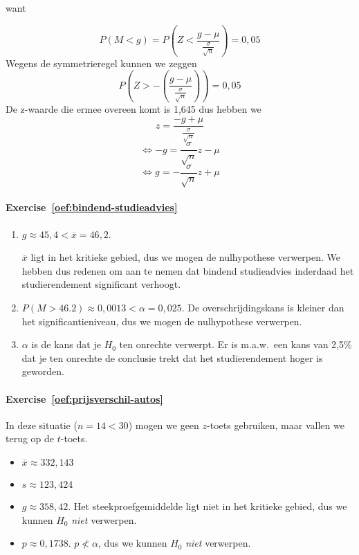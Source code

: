 want

\[ P(M < g) = P\left(Z < \frac{g - \mu}{\frac{\sigma}{\sqrt{n}}}\right) = 0,05 \]
Wegens de symmetrieregel kunnen we zeggen
\[ P\left(Z > - \left( \frac{g - \mu}{\frac{\sigma}{\sqrt{n}}} \right) \right) = 0,05 \]
De z-waarde die ermee overeen komt is 1,645 dus hebben we
\[ z = \frac{-g + \mu}{\frac{\sigma}{\sqrt{n}}} \]
\[ \Leftrightarrow -g = \frac{\sigma}{\sqrt{n}} z - \mu \]
\[ \Leftrightarrow g = -\frac{\sigma}{\sqrt{n}} z + \mu \]

\paragraph{Exercise~\ref{oef:bindend-studieadvies}}

\begin{enumerate}
  \item $g \approx 45,4 < \overline{x} = 46,2$.
  
  $\overline{x}$ ligt in het kritieke gebied, dus we mogen de nulhypothese verwerpen. We hebben dus redenen om aan te nemen dat bindend studieadvies inderdaad het studierendement significant verhoogt.
  
  \item $P(M > 46.2) \approx 0,0013 < \alpha = 0,025$. De overschrijdingskans is kleiner dan het significantieniveau, dus we mogen de nulhypothese verwerpen.
  
  \item  $\alpha$ is de kans dat je $H_{0}$ ten onrechte verwerpt. Er is m.a.w.~een kans van 2,5\% dat je ten onrechte de conclusie trekt dat het studierendement hoger is geworden.
\end{enumerate}

\paragraph{Exercise~\ref{oef:prijsverschil-autos}}

In deze situatie ($n = 14 < 30$) mogen we geen $z$-toets gebruiken, maar vallen we terug op de $t$-toets.

\begin{itemize}
  \item $\overline{x} \approx 332,143$
  \item $s \approx 123,424$
  \item $g \approx 358,42$. Het steekproefgemiddelde ligt niet in het kritieke gebied, dus we kunnen $H_0$ \emph{niet} verwerpen.
  \item $p \approx 0,1738$. $p \nless \alpha$, dus we kunnen $H_0$ \emph{niet} verwerpen.
\end{itemize}

